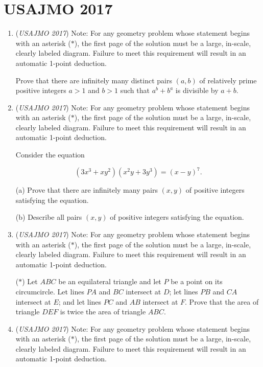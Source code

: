 \section{USAJMO 2017}
        \begin{enumerate}
        	\item (\textit{USAJMO 2017}) Note: For any geometry problem whose statement begins with an asterisk ($*$), the first page of the solution must be a large, in-scale, clearly labeled diagram. Failure to meet this requirement will result in an automatic 1-point deduction. 


 Prove that there are infinitely many distinct pairs $(a,b)$ of relatively prime positive integers $a > 1$ and $b > 1$ such that $a^b + b^a$ is divisible by $a + b.$


	\item (\textit{USAJMO 2017}) Note: For any geometry problem whose statement begins with an asterisk ($*$), the first page of the solution must be a large, in-scale, clearly labeled diagram. Failure to meet this requirement will result in an automatic 1-point deduction. 


 Consider the equation 

 \[\left(3x^3 + xy^2 \right) \left(x^2y + 3y^3 \right) = (x-y)^7.\]


 	(a) Prove that there are infinitely many pairs $(x,y)$ of positive integers satisfying the equation. 


 	(b) Describe all pairs $(x,y)$ of positive integers satisfying the equation. 


 

	\item (\textit{USAJMO 2017}) Note: For any geometry problem whose statement begins with an asterisk ($*$), the first page of the solution must be a large, in-scale, clearly labeled diagram. Failure to meet this requirement will result in an automatic 1-point deduction. 


 ($*$) Let $ABC$ be an equilateral triangle and let $P$ be a point on its circumcircle. Let lines $PA$ and $BC$ intersect at $D$; let lines $PB$ and $CA$ intersect at $E$; and let lines $PC$ and $AB$ intersect at $F$. Prove that the area of triangle $DEF$ is twice the area of triangle $ABC$.


 

	\item (\textit{USAJMO 2017}) Note: For any geometry problem whose statement begins with an asterisk ($*$), the first page of the solution must be a large, in-scale, clearly labeled diagram. Failure to meet this requirement will result in an automatic 1-point deduction. 



\end{enumerate}
